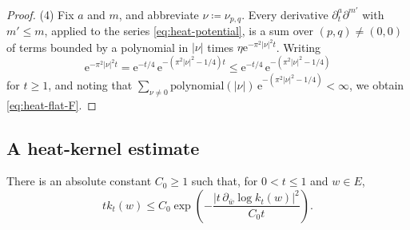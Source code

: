 \documentclass[11pt,a4paper]{article}
\begin{document}
\begin{proof}
		(4)  Fix $a$ and $m$, and abbreviate $\nu\coloneqq\nu_{p,q}$.  Every
		derivative $\partial_t^a\partial^{m'}$ with $m'\le m$, applied to the
		series \eqref{eq:heat-potential}, is a sum over $(p,q)\ne(0,0)$ of terms
		bounded by a polynomial in $|\nu|$ times
		$\eta\mathrm{e}^{-\pi^2|\nu|^2t}$.  Writing
		\[
		\mathrm{e}^{-\pi^2|\nu|^2t}
		=\mathrm{e}^{-t/4}\,\mathrm{e}^{-(\pi^2|\nu|^2-1/4)t}
		\le \mathrm{e}^{-t/4}\,\mathrm{e}^{-(\pi^2|\nu|^2-1/4)}
		\]
		for $t\ge1$, and noting that
		$\sum_{\nu\ne 0}\mathrm{polynomial}(|\nu|)\,
		\mathrm{e}^{-(\pi^2|\nu|^2-1/4)}<\infty$, we obtain
		\eqref{eq:heat-flat-F}.
	\end{proof}
	
	\subsection{A heat-kernel estimate}

	\begin{lemma}
		There is an absolute constant $C_0\ge1$ such that, for
		$0<t\le1$ and $w\in E$,
		\begin{equation}
			tk_t(w)\le C_0\exp\left(
			-\frac{|t\,\partial_{\bar w}\log k_t(w)|^2}{C_0t}
			\right).
			\label{eq:heat-localization}
		\end{equation}
	\end{lemma}
\end{document}
